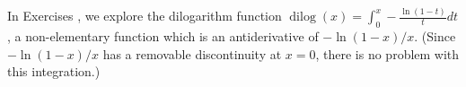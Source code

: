 {\noindent In Exercises}
{, we explore the dilogarithm function $\operatorname{dilog}(x)=\int_0^x - \frac{\ln(1-t)}{t} dt$, a non-elementary function which is an antiderivative of $-\ln(1-x)/x$.  (Since $-\ln(1-x)/x$ has a removable discontinuity at $x=0$, there is no problem with this integration.)
}
